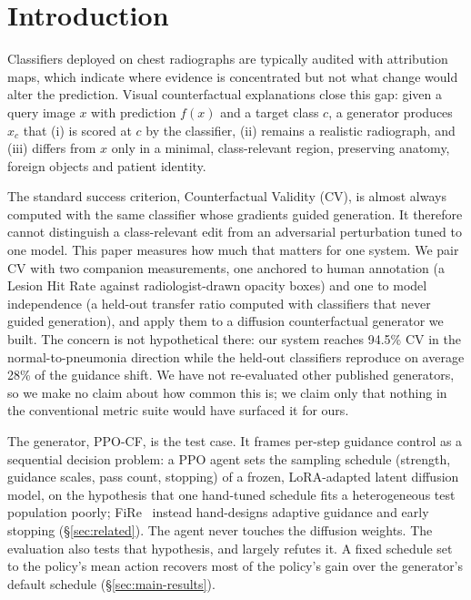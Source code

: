 \section{Introduction}
\label{sec:intro}

Classifiers deployed on chest radiographs are typically audited with attribution maps, which indicate where evidence is concentrated but not what change would alter the prediction. Visual counterfactual explanations close this gap: given a query image $x$ with prediction $f(x)$ and a target class $c$, a generator produces $x_c$ that (i) is scored at $c$ by the classifier, (ii) remains a realistic radiograph, and (iii) differs from $x$ only in a minimal, class-relevant region, preserving anatomy, foreign objects and patient identity.

The standard success criterion, Counterfactual Validity (CV), is almost always computed with the same classifier whose gradients guided generation. It therefore cannot distinguish a class-relevant edit from an adversarial perturbation tuned to one model. This paper measures how much that matters for one system. We pair CV with two companion measurements, one anchored to human annotation (a Lesion Hit Rate against radiologist-drawn opacity boxes) and one to model independence (a held-out transfer ratio computed with classifiers that never guided generation), and apply them to a diffusion counterfactual generator we built. The concern is not hypothetical there: our system reaches 94.5\% CV in the normal-to-pneumonia direction while the held-out classifiers reproduce on average 28\% of the guidance shift. We have not re-evaluated other published generators, so we make no claim about how common this is; we claim only that nothing in the conventional metric suite would have surfaced it for ours.

The generator, PPO-CF, is the test case. It frames per-step guidance control as a sequential decision problem: a PPO agent sets the sampling schedule (strength, guidance scales, pass count, stopping) of a frozen, LoRA-adapted latent diffusion model, on the hypothesis that one hand-tuned schedule fits a heterogeneous test population poorly; FiRe~\cite{zeng2026fire} instead hand-designs adaptive guidance and early stopping (\S\ref{sec:related}). The agent never touches the diffusion weights. The evaluation also tests that hypothesis, and largely refutes it. A fixed schedule set to the policy's mean action recovers most of the policy's gain over the generator's default schedule (\S\ref{sec:main-results}).

